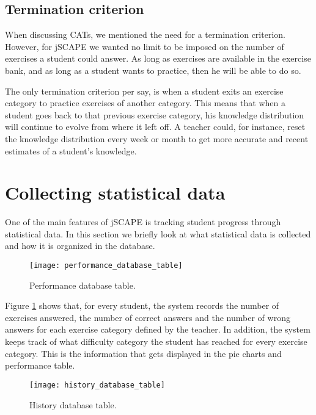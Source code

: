 \subsection{Termination criterion}
When discussing CATs, we mentioned the need for a termination criterion. However, for jSCAPE we wanted no limit to be imposed on the number of exercises a student could answer. As long as exercises are available in the exercise bank, and as long as a student wants to practice, then he will be able to do so.\newline

The only termination criterion per say, is when a student exits an exercise category to practice exercises of another category. This means that when a student goes back to that previous exercise category, his knowledge distribution will continue to evolve from where it left off. A teacher could, for instance, reset the knowledge distribution every week or month to get more accurate and recent estimates of a student's knowledge.

\section{Collecting statistical data}
One of the main features of jSCAPE is tracking student progress through statistical data. In this section we briefly look at what statistical data is collected and how it is organized in the database.

\begin{figure}[H]
\centering
\texttt{[image: performance\_database\_table]}
\caption{Performance database table.}
\label{fig:performance_database_table}
\end{figure}

Figure \ref{fig:performance_database_table} shows that, for every student, the system records the number of exercises answered, the number of correct answers and the number of wrong answers for each exercise category defined by the teacher. In addition, the system keeps track of what difficulty category the student has reached for every exercise category. This is the information that gets displayed in the pie charts and performance table.

\begin{figure}[H]
\centering
\texttt{[image: history\_database\_table]}
\caption{History database table.}
\label{fig:history_database_table}
\end{figure}

